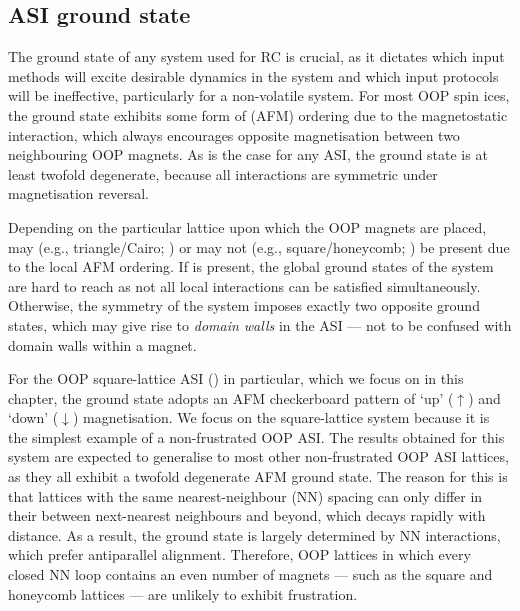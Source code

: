 \subsection{ASI ground state}
The ground state of any system used for RC is crucial, as it dictates which input methods will excite desirable dynamics in the system and which input protocols will be ineffective, particularly for a non-volatile system.
For most OOP spin ices, the ground state exhibits some form of  (AFM) ordering due to the magnetostatic interaction, which always encourages opposite magnetisation between two neighbouring OOP magnets.
As is the case for any ASI, the ground state is at least twofold degenerate, because all interactions are symmetric under magnetisation reversal. \par
Depending on the particular lattice upon which the OOP magnets are placed,  may (e.g., triangle/Cairo; ) or may not (e.g., square/honeycomb; ) be present due to the local AFM ordering.
If  is present, the global ground states of the system are hard to reach as not all local interactions can be satisfied simultaneously.
Otherwise, the symmetry of the system imposes exactly two opposite ground states, which may give rise to \textit{domain walls} in the ASI --- not to be confused with domain walls within a magnet. \par %
For the OOP square-lattice ASI () in particular, which we focus on in this chapter, the ground state adopts an AFM checkerboard pattern of `up' ($\uparrow$) and `down' ($\downarrow$) magnetisation.
We focus on the square-lattice system because it is the simplest example of a non-frustrated OOP ASI.
The results obtained for this system are expected to generalise to most other non-frustrated OOP ASI lattices, as they all exhibit a twofold degenerate AFM ground state.
The reason for this is that lattices with the same nearest-neighbour (NN) spacing can only differ in their  between next-nearest neighbours and beyond, which decays rapidly with distance.
As a result, the ground state is largely determined by NN interactions, which prefer antiparallel alignment.
Therefore, OOP lattices in which every closed NN loop contains an even number of magnets --- such as the square and honeycomb lattices --- are unlikely to exhibit frustration.

